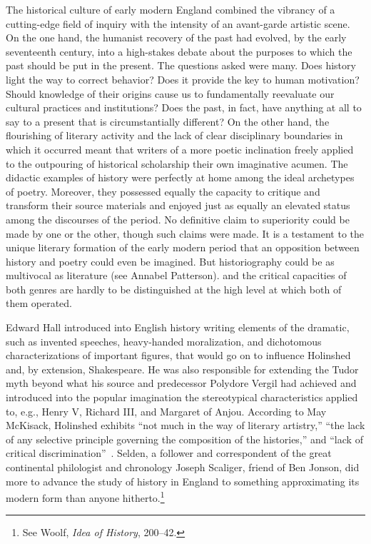 The historical culture of early modern England combined the vibrancy of a cutting-edge field of inquiry with the intensity of an avant-garde artistic scene. On the one hand, the humanist recovery of the past had evolved, by the early seventeenth century, into a high-stakes debate about the purposes to which the past should be put in the present. The questions asked were many. Does history light the way to correct behavior? Does it provide the key to human motivation? Should knowledge of their origins cause us to fundamentally reevaluate our cultural practices and institutions? Does the past, in fact, have anything at all to say to a present that is circumstantially different? On the other hand, the flourishing of literary activity and the lack of clear disciplinary boundaries in which it occurred meant that writers of a more poetic inclination freely applied to the outpouring of historical scholarship their own imaginative acumen. The didactic examples of history were perfectly at home among the ideal archetypes of poetry. Moreover, they possessed equally the capacity to critique and transform their source materials and enjoyed just as equally an elevated status among the discourses of the period. No definitive claim to superiority could be made by one or the other, though such claims were made. It is a testament to the unique literary formation of the early modern period that an opposition between history and poetry could even be imagined. But historiography could be as multivocal as literature (see Annabel Patterson).\nocite{patterson_reading_1994}
and the critical capacities of both genres are hardly to be distinguished at the high level at which both of them operated.

Edward Hall introduced into English history writing elements of the dramatic, such as invented speeches, heavy-handed moralization, and dichotomous characterizations of important figures, that would go on to influence Holinshed and, by extension, Shakespeare. He was also responsible for extending the Tudor myth beyond what his source and predecessor Polydore Vergil had achieved and introduced into the popular imagination the stereotypical characteristics applied to, e.g., Henry V, Richard III, and Margaret of Anjou.\nocite{hall_union_1550} According to May McKisack, Holinshed exhibits ``not much in the way of literary artistry,'' ``the lack of any selective principle governing the composition of the histories,'' and ``lack of critical discrimination''~\cite[117--118]{mckisack_medieval_1971}. Selden, a follower and correspondent of the great continental philologist and chronology Joseph Scaliger, friend of Ben Jonson, did more to advance the study of history in England to something approximating its modern form than anyone hitherto.\footnote{See Woolf, \emph{Idea of History}, 200--42.}

